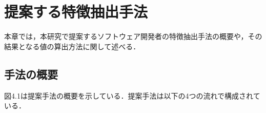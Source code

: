\documentclass{funthesis}
\begin{document}

\chapter{提案する特徴抽出手法}
本章では，本研究で提案するソフトウェア開発者の特徴抽出手法の概要や，その結果となる値の算出方法に関して述べる．
\section{手法の概要}
図4.1は提案手法の概要を示している．提案手法は以下の4つの流れで構成されている．
\end{document}
